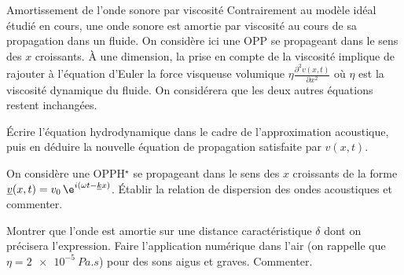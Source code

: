 \begin{exo}[PC]{Amortissement de l'onde sonore par viscosité}
  Contrairement au modèle idéal étudié en cours, une onde sonore est amortie par viscosité au cours de sa propagation dans un fluide. On considère ici une OPP se propageant dans le sens des $x$ croissants. À une dimension, la prise en compte de la viscosité implique de rajouter à l'équation d'Euler la force visqueuse volumique $\eta\frac{\partial^2 v(x,t)}{\partial x^2}$ où $\eta$ est la viscosité dynamique du fluide. On considérera que les deux autres équations restent inchangées.
   \begin{quest}
  \item Écrire l'équation hydrodynamique dans le cadre de l'approximation acoustique, puis en déduire la nouvelle équation de propagation satisfaite par $v(x,t)$.
  \item On considère une OPPH$^{\star}$ se propageant dans le sens des $x$ croissants de la forme $\underline{v}(x,t)=v_0\,\e^{i(\omega t-\underline{k}x)}$. Établir la relation de dispersion des ondes acoustiques et commenter.
  \item Montrer que l'onde est amortie sur une distance caractéristique $\delta$ dont on précisera l'expression. Faire l'application numérique dans l'air (on rappelle que $\eta=\SI{2e-5}{Pa.s}$) pour des sons aigus et graves. Commenter.
  \end{quest}
  \end{exo}
  
